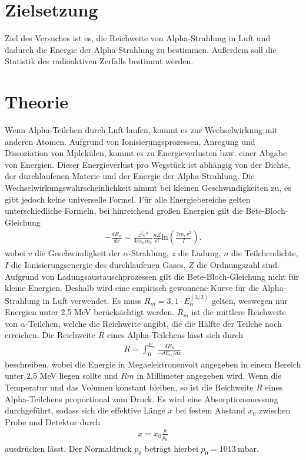 \section{Zielsetzung}
\label{sec:Zielsetzung}

Ziel des Versuches ist es, die Reichweite von Alpha-Strahlung in Luft und dadurch die Energie der Alpha-Strahlung zu bestimmen.
Außerdem soll die Statistik des radioaktiven Zerfalls bestimmt werden.

\section{Theorie}
\label{sec:Theorie}

Wenn Alpha-Teilchen durch Luft laufen, kommt es zur Wechselwirkung mit anderen Atomen. Aufgrund von Ionisierungsprozessen, Anregung
und Dissoziation von Mplekülen, kommt es zu Energieverlusten bzw. einer Abgabe von Energien.
Dieser Energieverlust pro Wegstück ist abhängig von der Dichte, der durchlaufenen Materie und der Energie der Alpha-Strahlung.
Die Wechselwirkungswahrscheinlichkeit nimmt bei kleinen Geschwindigkeiten zu, es gibt jedoch keine universelle Formel.
Für alle Energiebereiche gelten unterschiedliche Formeln, bei hinreichend großen Energien gilt die Bete-Bloch-Gleichung
\begin{align}
    -\frac{dE_\alpha}{dx} = \frac{z^2e^4}{4 \pi \epsilon_0 m_e}\frac{nZ}{v^2}\text{ln}\left(\frac{2 m_e v^2}{I}\right).\label{eqn:Bete}
\end{align}
wobei $v$ die Geschwindigkeit der $\alpha$-Strahlung, $z$ die Ladung, $n$ die Teilchendichte, $I$ die Ionisierungsenergie des durchlaufenen Gases, $Z$ die Ordnungszahl sind.
Aufgrund von Ladungsaustauschprozessen gilt die Bete-Bloch-Gleichung nicht für kleine Energien.
Deshalb wird eine empirisch gewonnene Kurve für die Alpha-Strahlung in Luft verwendet.
Es muss $R_m=3,1 \cdot E_{\alpha}^(3/2)$ gelten, weswegen nur Energien unter 2,5 MeV berücksichtigt werden.
$R_m$ ist die mittlere Reichweite von $\alpha$-Teilchen, welche die Reichweite angibt, die die Hälfte der Teilche noch erreichen.
Die Reichweite $R$ eines Alpha-Teilchens lässt sich durch
\begin{align}
  R=  \int_0^{E_\alpha} \frac{dE_\alpha}{-dE_\alpha/dx} \label{eqn:Reichweite}
\end{align} 
beschreiben, wobei die Energie in Megaelektronenvolt angegeben in einem Bereich unter 2,5 MeV
liegen sollte und $Rm$ in Millimeter angegeben wird.
Wenn die Temperatur und das Volumen konstant bleiben, so ist die Reichweite $R$ eines Alpha-Teilchens proportional zum Druck.
Es wird eine Absorptionsmessung durchgeführt, sodass sich die effektive Länge $x$ bei festem Abstand $x_0$ zwischen Probe und Detektor
durch
\begin{align}
    x = x_0 \frac{p}{p_0}
\end{align}
ausdrücken lässt. Der Normaldruck $p_0$ beträgt hierbei $p_0= \qty{1013}{\milli\bar}$.



